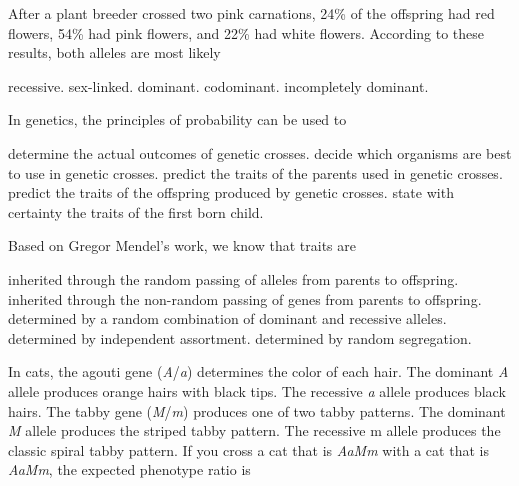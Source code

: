 \question
After a plant breeder crossed two pink carnations, 24\% of the offspring had red flowers, 54\% had pink flowers, and 22\% had white flowers. According to these results, both alleles are most likely

\begin{choices}
\choice recessive.%
\choice sex-linked.%
\choice dominant.%
\choice codominant.%
\correctchoice incompletely dominant.%
\end{choices}


\question
In genetics, the principles of probability can be used to

\begin{choices}
\choice determine the actual outcomes of genetic crosses.%
\choice decide which organisms are best to use in genetic crosses.%
\choice predict the traits of the parents used in genetic crosses.%
\correctchoice predict the traits of the offspring produced by genetic crosses.%
\choice state with certainty the traits of the first born child.%
\end{choices}


\question
Based on Gregor Mendel's work, we know that traits are

\begin{choices}
\correctchoice inherited through the random passing of alleles from parents to offspring.%
\choice inherited through the non-random passing of genes from parents to offspring.%
\choice determined by a random combination of dominant and recessive alleles.%
\choice determined by independent assortment.%
\choice determined by random segregation.%
\end{choices}



\question
In cats, the agouti gene (\textit{A}/\textit{a}) determines the color of each hair. The dominant \textit{A} allele produces orange hairs with black tips.  The recessive \textit{a} allele produces black hairs.  The tabby gene (\textit{M}/\textit{m}) produces one of two tabby patterns.  The dominant \textit{M} allele produces the striped tabby pattern.  The recessive m allele produces the classic spiral tabby pattern. If you cross a cat that is \textit{AaMm} with a cat that is \textit{AaMm}, the expected phenotype ratio is

